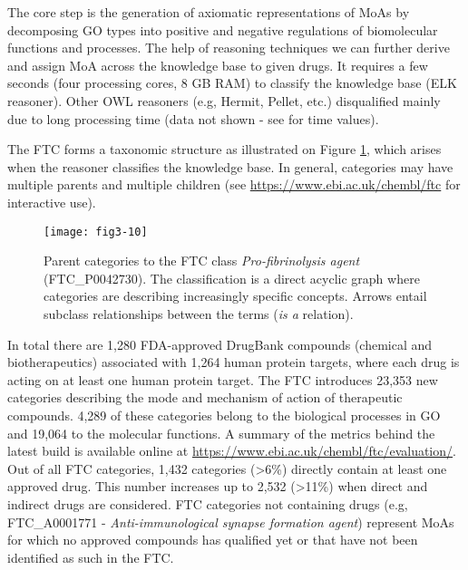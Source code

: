 The core step is the generation of axiomatic representations of MoAs by decomposing GO types into positive and negative regulations of biomolecular functions and processes. The help of reasoning techniques we can further derive and assign MoA across the knowledge base to given drugs. It requires a few seconds (four processing cores, 8 GB RAM) to classify the knowledge base (ELK reasoner). Other OWL reasoners (e.g, Hermit, Pellet, etc.) disqualified mainly due to long processing time (data not shown - see \cite{gonccalves2013owl} for time values).

The FTC forms a taxonomic structure as illustrated on Figure \ref{fig3-10}, which arises when the reasoner classifies the knowledge base. In general, categories may have multiple parents and multiple children (see \url{https://www.ebi.ac.uk/chembl/ftc} for interactive use).

\begin{figure}[ht]
    \centering
    \texttt{[image: fig3-10]}
    \caption{Parent categories to the FTC class \emph{Pro-fibrinolysis agent} (FTC\_P0042730). The classification is a direct acyclic graph where categories are describing increasingly specific concepts. Arrows entail subclass relationships between the terms (\emph{is a} relation).}
    \label{fig3-10}
\end{figure}

In total there are 1,280 FDA-approved DrugBank compounds (chemical and biotherapeutics) associated with 1,264 human protein targets, where each drug is acting on at least one human protein target. The FTC introduces 23,353 new categories describing the mode and mechanism of action of therapeutic compounds. 4,289 of these categories belong to the biological processes in GO and 19,064 to the molecular functions. A summary of the metrics behind the latest build is available online at \url{https://www.ebi.ac.uk/chembl/ftc/evaluation/}. Out of all FTC categories, 1,432 categories (\textgreater 6\%) directly contain at least one approved drug. This number increases up to 2,532 (\textgreater 11\%) when direct and indirect drugs are considered. FTC categories not containing drugs (e.g, FTC\_A0001771 - \emph{Anti-immunological synapse formation agent}) represent MoAs for which no approved compounds has qualified yet or that have not been identified as such in the FTC.

